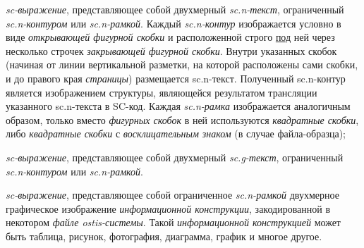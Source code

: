 \begin{SCn}
\begin{scnstruct}
{\begin{scnitemize}
                \item \textit{sc-выражение}, представляющее собой двухмерный \textit{\mbox{sc.n-текст}}, ограниченный \textit{sc.n-контуром} или \textit{sc.n-рамкой}. Каждый \textit{sc.n-контур} изображается условно в виде \textit{открывающей фигурной скобки} и расположенной строго \uline{под} ней через несколько строчек \textit{закрывающей фигурной скобки}. Внутри указанных скобок (начиная от линии вертикальной разметки, на которой расположены сами скобки, и до правого края \textit{страницы}) размещается sc.n-текст. Полученный sc.n-контур является изображением структуры, являющейся результатом трансляции указанного sc.n-текста в SC-код. Каждая \textit{sc.n-рамка} изображается аналогичным образом, только вместо \textit{фигурных скобок} в ней используются \textit{квадратные скобки}, либо \textit{квадратные скобки} с \textit{восклицательным знаком} (в случае файла-образца);
                \item \textit{sc-выражение}, представляющее собой двухмерный \textit{sc.g-текст}, ограниченный \textit{\mbox{sc.n-контуром}} или \textit{\mbox{sc.n-рамкой}}.
                \item \textit{sc-выражение}, представляющее собой ограниченное \textit{sc.n-рамкой} двухмерное графическое изображение \textit{информационной конструкции}, закодированной в некотором \textit{файле ostis-системы}. Такой \textit{информационной конструкцией} может быть таблица, рисунок, фотография, диаграмма, график и многое другое.
            \end{scnitemize}
        }
        \begin{scnindent}
        \end{scnindent}
            

        \newpage
        

\end{scnstruct}
\end{SCn}
